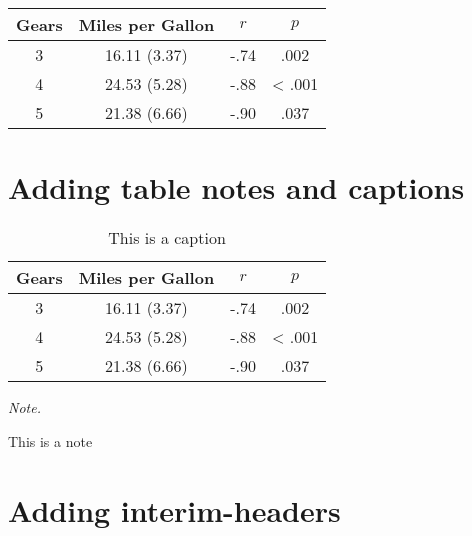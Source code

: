 \documentclass[
  english,
  man,floatsintext]{apa6}
\begin{document}
\begin{tabular}{cccc}
\toprule
Gears & Miles per Gallon & $r$ & $p$\\
\midrule
3 & 16.11 (3.37) & -.74 & .002\\
4 & 24.53 (5.28) & -.88 & < .001\\
5 & 21.38 (6.66) & -.90 & .037\\
\bottomrule
\end{tabular}

\newpage

\hypertarget{adding-table-notes-and-captions}{%
\section{Adding table notes and captions}\label{adding-table-notes-and-captions}}

\begin{table}

\caption{\label{tab:unnamed-chunk-8}This is a caption}
\centering
\begin{threeparttable}
\begin{tabular}[t]{cccc}
\toprule
Gears & Miles per Gallon & $r$ & $p$\\
\midrule
3 & 16.11 (3.37) & -.74 & .002\\
4 & 24.53 (5.28) & -.88 & < .001\\
5 & 21.38 (6.66) & -.90 & .037\\
\bottomrule
\end{tabular}
\begin{tablenotes}[para]
\item \textit{Note.} 
\item This is a note
\end{tablenotes}
\end{threeparttable}
\end{table}

\newpage

\hypertarget{adding-interim-headers}{%
\section{Adding interim-headers}\label{adding-interim-headers}}
\end{document}
